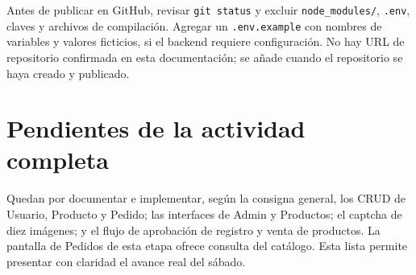 \documentclass[11pt,letterpaper]{article}
\begin{document}
Antes de publicar en GitHub, revisar \texttt{git status} y excluir \texttt{node\_modules/}, \texttt{.env}, claves y archivos de compilación. Agregar un \texttt{.env.example} con nombres de variables y valores ficticios, si el backend requiere configuración. No hay URL de repositorio confirmada en esta documentación; se añade cuando el repositorio se haya creado y publicado.

\section{Pendientes de la actividad completa}
Quedan por documentar e implementar, según la consigna general, los CRUD de Usuario, Producto y Pedido; las interfaces de Admin y Productos; el captcha de diez imágenes; y el flujo de aprobación de registro y venta de productos. La pantalla de Pedidos de esta etapa ofrece consulta del catálogo. Esta lista permite presentar con claridad el avance real del sábado.
\end{document}
